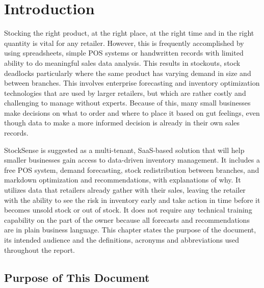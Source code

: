 \documentclass{StockSense}
\begin{document}
\pagestyle{fancy}

\tableofcontents

\pagebreak

\listoffigures

\pagebreak

\listoftables

\mainmatter


\chapter{Introduction}

Stocking the right product, at the right place, at the right time and in the right quantity is vital for any retailer. However, this is frequently accomplished by using spreadsheets, simple POS systems or handwritten records with limited ability to do meaningful sales data analysis. This results in stockouts, stock deadlocks particularly where the same product has varying demand in size and between branches. This involves enterprise forecasting and inventory optimization technologies that are used by larger retailers, but which are rather costly and challenging to manage without experts. Because of this, many small businesses make decisions on what to order and where to place it based on gut feelings, even though data to make a more informed decision is already in their own sales records.

StockSense is suggested as a multi-tenant, SaaS-based solution that will help smaller businesses gain access to data-driven inventory management. It includes a free POS system, demand forecasting, stock redistribution between branches, and markdown optimization and recommendations, with explanations of why. It utilizes data that retailers already gather with their sales, leaving the retailer with the ability to see the risk in inventory early and take action in time before it becomes unsold stock or out of stock. It does not require any technical training capability on the part of the owner because all forecasts and recommendations are in plain business language. This chapter states the purpose of the document, its intended audience and the definitions, acronyms and abbreviations used throughout the report.

\section{Purpose of This Document}
\end{document}
